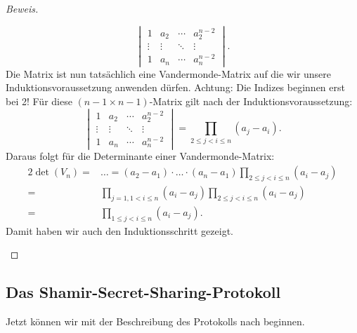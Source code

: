 \documentclass[12pt, a4paper, oneside, titlepage]{report}
\newenvironment{bew}{\begin{proof}[Beweis]}{\end{proof}}
\theoremstyle{definition}
\begin{document}
\begin{bew}
\begin{itemize}
{$$\begin{vmatrix}
				1 & a_2 & \cdots & a_2^{n-2} \\
				\vdots & \vdots & \ddots & \vdots \\     
				1 & a_n & \cdots & a_n^{n-2}
				\end{vmatrix}.$$
				Die Matrix ist nun tatsächlich eine Vandermonde-Matrix auf die wir unsere Induktionsvoraussetzung anwenden dürfen. Achtung: Die Indizes beginnen erst bei 2! Für diese $ (n-1 \times n-1) $-Matrix gilt nach der Induktionsvoraussetzung:
				$$\begin{vmatrix}
				1 & a_2 & \cdots & a_2^{n-2} \\
				\vdots & \vdots & \ddots & \vdots \\     
				1 & a_n & \cdots & a_n^{n-2}
				\end{vmatrix}
				= \prod_{2 \leq j < i \leq n} (a_j-a_i).$$
				Daraus folgt für die Determinante einer Vandermonde-Matrix:
				\begin{alignat*}{2}
				\det (V_n) = & \ldots = (a_2 - a_1) \cdot \ldots \cdot (a_n - a_1) \prod_{2 \leq j < i \leq n} (a_i - a_j)\\
				 = & \prod_{j=1, 1 < i \leq n} (a_i - a_j) \prod_{2 \leq j < i \leq n} (a_i - a_j)\\
				 = & \prod_{1 \leq j < i \leq n} (a_i - a_j).
				\end{alignat*}
			Damit haben wir auch den Induktionsschritt gezeigt.
			}
		\end{itemize}
	\end{bew}
	
	\subsection{Das Shamir-Secret-Sharing-Protokoll}
	Jetzt können wir mit der Beschreibung des Protokolls nach \cite{buchmann} beginnen.
	
\end{document}
